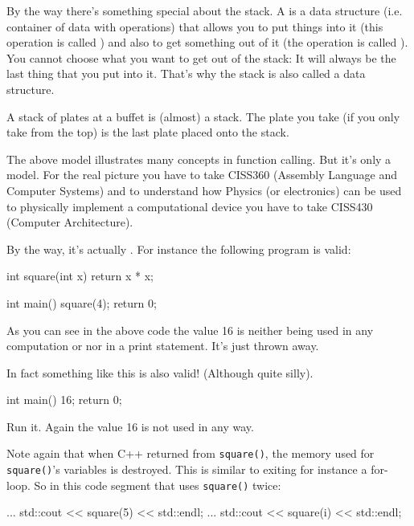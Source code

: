 By the way there's something special about the stack. A  is a data structure (i.e. container of data with operations) that allows you to put things into it (this operation is called ) and also to get something out of it (the operation is called ). You cannot choose what you want to get out of the stack: It will always be the last thing that you put into it. That's why the stack is also called a   data structure.

A stack of plates at a buffet is (almost) a stack. The plate you take (if you only take from the top) is the last plate placed onto the stack.

The above model illustrates many concepts in function calling. But it's only a model. For the real picture you have to take CISS360 (Assembly Language and Computer Systems) and to understand how Physics (or electronics) can be used to physically implement a computational device you have to take CISS430 (Computer Architecture).

By the way, it's actually . For instance the following program is valid:

\begin{consolethree}[escapeinside=||]
int square(int x)
{
    return x * x;
}

int main()
{
    square(4);
    return 0;
}
\end{consolethree}

As you can see in the above code the value 16 is neither being used in any computation or nor in a print statement. It's just thrown away.

In fact something like this is also valid! (Although quite silly).

\begin{consolethree}[escapeinside=||]
int main()
{
    16;
    return 0;
}
\end{consolethree}

Run it. Again the value 16 is not used in any way.

Note again that when C++ returned from \texttt{square()}, the memory used for \texttt{square()}'s variables is destroyed. This is similar to exiting for instance a for-loop. So in this code segment that uses \texttt{square()} twice:

\begin{consolethree}[escapeinside=||]
...
std::cout << square(5) << std::endl;
...
std::cout << square(i) << std::endl;
\end{consolethree}

